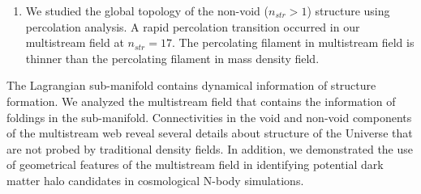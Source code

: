 \begin{enumerate}

\item We studied the global topology of the non-void ($n_{str} > 1$) structure using percolation analysis. A rapid percolation transition occurred in our multistream field at $n_{str} = 17$. The percolating filament in multistream field is thinner than the percolating filament in mass density field. 

\end{enumerate}

The Lagrangian sub-manifold contains dynamical information of structure formation. We analyzed the multistream field that contains the information of foldings in the sub-manifold.  Connectivities in the void and non-void components of the multistream web reveal several details about structure of the Universe that are not probed by traditional density fields. In addition, we demonstrated the use of geometrical features of the multistream field in identifying potential dark matter halo candidates in cosmological N-body simulations. 



